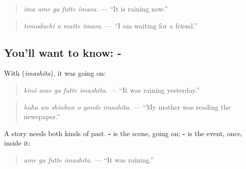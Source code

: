 \begin{quote}
\textbf{  }
\end{quote}

\begin{quote}
\emph{ima ame ga futte imasu.} — \textquotedblleft{}It is raining now.\textquotedblright{}
\end{quote}

\begin{quote}
\textbf{ }
\end{quote}

\begin{quote}
\emph{tomodachi o matte imasu.} — \textquotedblleft{}I am waiting for a friend.\textquotedblright{}
\end{quote}

\subsection*{You'll want to know: -}
With \textbf{} (\emph{imashita}), it was going on:

\begin{quote}
\textbf{  }
\end{quote}

\begin{quote}
\emph{kinō ame ga futte imashita.} — \textquotedblleft{}It was raining yesterday.\textquotedblright{}
\end{quote}

\begin{quote}
\textbf{  }
\end{quote}

\begin{quote}
\emph{haha wa shinbun o yonde imashita.} — \textquotedblleft{}My mother was reading the newspaper.\textquotedblright{}
\end{quote}

A story needs both kinds of past. \textbf{-} is the scene, going on; \textbf{-} is the event, once, inside it:

\begin{quote}
\textbf{ }
\end{quote}

\begin{quote}
\emph{ame ga futte imashita.} — \textquotedblleft{}It was raining.\textquotedblright{}
\end{quote}

